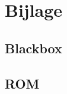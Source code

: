 \documentclass[oneside,dutch]{tudelft-report}
\begin{document}
\chapter{Bijlage}
\section{Blackbox}
\label{Blackbox entity}
 
\label{Blackbox behaviour}

\label{Stream entity}

\label{Stream behaviour}


\section{ROM}
\label{ROM}

\end{document}
